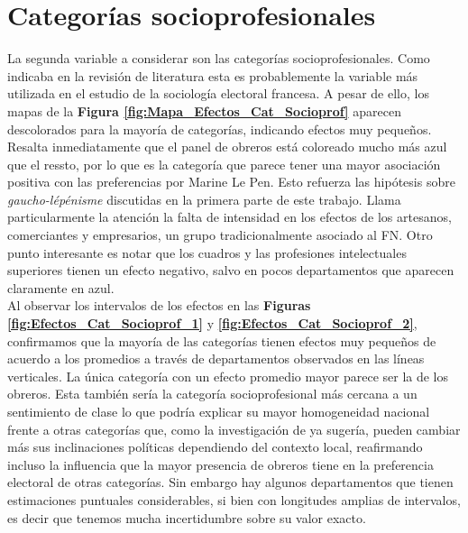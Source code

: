 \section{Categorías socioprofesionales}

La segunda variable a considerar son las categorías socioprofesionales. Como indicaba en la revisión de literatura esta es probablemente la variable más utilizada en el estudio de la sociología electoral francesa. A pesar de ello, los mapas de la \textbf{Figura \ref{fig:Mapa_Efectos_Cat_Socioprof}} aparecen descolorados para la mayoría de categorías, indicando efectos muy pequeños. Resalta inmediatamente que el panel de obreros está coloreado mucho más azul que el ressto, por lo que es la categoría que parece tener una mayor asociación positiva con las preferencias por Marine Le Pen. Esto refuerza las hipótesis sobre \textit{gaucho-lépénisme} discutidas en la primera parte de este trabajo. Llama particularmente la atención la falta de intensidad en los efectos de los artesanos, comerciantes y empresarios, un grupo tradicionalmente asociado al FN. Otro punto interesante es notar que los cuadros y las profesiones intelectuales superiores tienen un efecto negativo, salvo en pocos departamentos que aparecen claramente en azul.\\ 

Al observar los intervalos de los efectos en las \textbf{Figuras \ref{fig:Efectos_Cat_Socioprof_1}} y \textbf{\ref{fig:Efectos_Cat_Socioprof_2}}, confirmamos que la mayoría de las categorías tienen efectos muy pequeños de acuerdo a los promedios a través de departamentos observados en las líneas verticales. La única categoría con un efecto promedio mayor parece ser la de los obreros. Esta también sería la categoría socioprofesional más cercana a un sentimiento de clase lo que podría explicar su mayor homogeneidad nacional frente a otras categorías que, como la investigación de \textcite{MayerMichelat81} ya sugería, pueden cambiar más sus inclinaciones políticas dependiendo del contexto local, reafirmando incluso la influencia que la mayor presencia de obreros tiene en la preferencia electoral de otras categorías. Sin embargo hay algunos departamentos que tienen estimaciones puntuales considerables, si bien con longitudes amplias de intervalos, es decir que tenemos mucha incertidumbre sobre su valor exacto.\\ 

